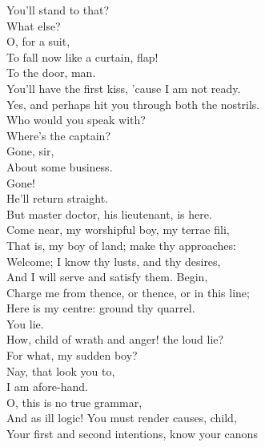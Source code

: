 \documentclass[a4paper,oneside]{memoir}
\begin{document}
\begin{drama*}
You'll stand to that?\\
\subtlespeaks {} What else?\\
\facespeaks {} O, for a suit,\\
To fall now like a curtain, flap!\\
\subtlespeaks {} To the door, man.\\
\facespeaks You'll have the first kiss, 'cause I am not ready.\\
\subtlespeaks Yes, and perhaps hit you through both the nostrils.\\
\facespeaks {} Who would you speak with?\\
\kastrilspeaks {} Where's the captain?\\
\facespeaks {} Gone, sir,\\
About some business.\\
\kastrilspeaks {} Gone!\\
\facespeaks {} He'll return straight.\\
But master doctor, his lieutenant, is here.\\
\subtlespeaks Come near, my worshipful boy, my terrae fili,\\
That is, my boy of land; make thy approaches:\\
Welcome; I know thy lusts, and thy desires,\\
And I will serve and satisfy them. Begin,\\
Charge me from thence, or thence, or in this line;\\
Here is my centre: ground thy quarrel.\\
\kastrilspeaks {} You lie.\\
\subtlespeaks How, child of wrath and anger! the loud lie?\\
For what, my sudden boy?\\
\kastrilspeaks {} Nay, that look you to,\\
I am afore-hand.\\
\subtlespeaks {} O, this is no true grammar,\\
And as ill logic! You must render causes, child,\\
Your first and second intentions, know your canons\\

\end{drama*}
\end{document}
